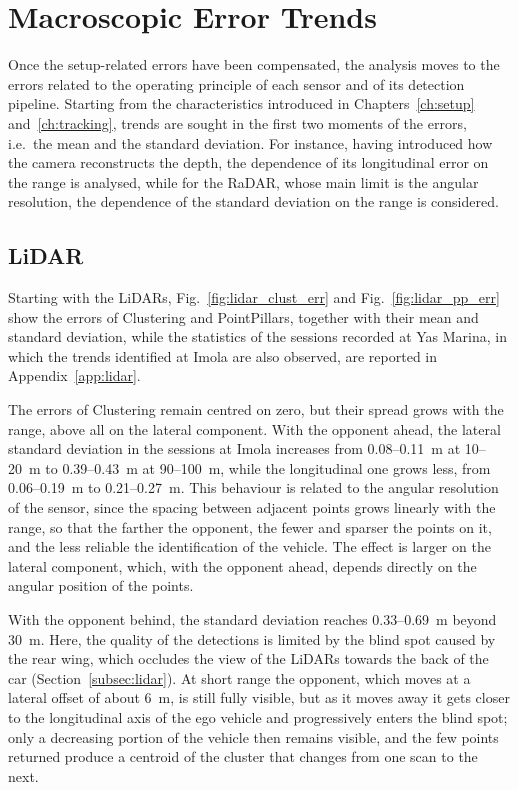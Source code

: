 \FloatBarrier
\section{Macroscopic Error Trends}
\label{sec:macro}

Once the setup-related errors have been compensated, the analysis moves to the errors related
to the operating principle of each sensor and of its detection pipeline. Starting from the
characteristics introduced in Chapters~\ref{ch:setup} and~\ref{ch:tracking}, trends are
sought in the first two moments of the errors, i.e.\ the mean and the standard deviation.
For instance, having introduced how the camera reconstructs the depth, the dependence of its
longitudinal error on the range is analysed, while for the RaDAR, whose main limit is the
angular resolution, the dependence of the standard deviation on the range is considered.


\subsection*{LiDAR}
\label{subsec:macro_lidar}

Starting with the LiDARs, Fig.~\ref{fig:lidar_clust_err} and Fig.~\ref{fig:lidar_pp_err}
show the errors of Clustering and PointPillars, together with their mean and standard
deviation, while the statistics of the sessions recorded at Yas Marina, in which the trends
identified at Imola are also observed, are reported in Appendix~\ref{app:lidar}.

The errors of Clustering remain centred on zero, but their spread grows with the range,
above all on the lateral component. With the opponent ahead, the lateral standard
deviation in the sessions at Imola increases from 0.08--\SI{0.11}{m} at 10--\SI{20}{m} to
0.39--\SI{0.43}{m} at 90--\SI{100}{m}, while the longitudinal one grows less, from
0.06--\SI{0.19}{m} to 0.21--\SI{0.27}{m}. This behaviour is related to the angular
resolution of the sensor, since the spacing between adjacent points grows linearly with the
range, so that the farther the opponent, the fewer and sparser the points on it, and the
less reliable the identification of the vehicle. The effect is larger on
the lateral component, which, with the opponent ahead, depends directly on the angular
position of the points.

With the opponent behind, the standard deviation reaches 0.33--\SI{0.69}{m} beyond
\SI{30}{m}. Here, the quality of the detections is limited by the blind spot caused by the
rear wing, which occludes the view of the LiDARs towards the back of the car
(Section~\ref{subsec:lidar}). At short range the opponent, which moves at a lateral offset
of about \SI{6}{m}, is still fully visible, but as it moves away it gets closer to the
longitudinal axis of the ego vehicle and progressively enters the blind spot; only a
decreasing portion of the vehicle then remains visible, and the few points returned produce
a centroid of the cluster that changes from one scan to the next.

